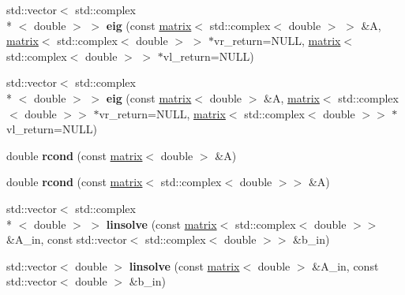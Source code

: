 \begin{DoxyCompactItemize}
\item 
\hypertarget{namespacekeycpp_a4262bb0ca13c9c1e11732b9b1dab65c6}{std\-::vector$<$ std\-::complex\\*
$<$ double $>$ $>$ {\bfseries eig} (const \hyperlink{classkeycpp_1_1matrix}{matrix}$<$ std\-::complex$<$ double $>$ $>$ \&A, \hyperlink{classkeycpp_1_1matrix}{matrix}$<$ std\-::complex$<$ double $>$ $>$ $\ast$vr\-\_\-return=N\-U\-L\-L, \hyperlink{classkeycpp_1_1matrix}{matrix}$<$ std\-::complex$<$ double $>$ $>$ $\ast$vl\-\_\-return=N\-U\-L\-L)}\label{namespacekeycpp_a4262bb0ca13c9c1e11732b9b1dab65c6}

\item 
\hypertarget{namespacekeycpp_a9e462b40dbbb92e5ebef12956d76e1f8}{std\-::vector$<$ std\-::complex\\*
$<$ double $>$ $>$ {\bfseries eig} (const \hyperlink{classkeycpp_1_1matrix}{matrix}$<$ double $>$ \&A, \hyperlink{classkeycpp_1_1matrix}{matrix}$<$ std\-::complex$<$ double $>$$>$ $\ast$vr\-\_\-return=N\-U\-L\-L, \hyperlink{classkeycpp_1_1matrix}{matrix}$<$ std\-::complex$<$ double $>$$>$ $\ast$vl\-\_\-return=N\-U\-L\-L)}\label{namespacekeycpp_a9e462b40dbbb92e5ebef12956d76e1f8}

\item 
\hypertarget{namespacekeycpp_a3905cfc35dbd146f5dbf7bcb5729c2c2}{double {\bfseries rcond} (const \hyperlink{classkeycpp_1_1matrix}{matrix}$<$ double $>$ \&A)}\label{namespacekeycpp_a3905cfc35dbd146f5dbf7bcb5729c2c2}

\item 
\hypertarget{namespacekeycpp_a4d9a9dd04453e5a417f7a9eb8ae4391b}{double {\bfseries rcond} (const \hyperlink{classkeycpp_1_1matrix}{matrix}$<$ std\-::complex$<$ double $>$$>$ \&A)}\label{namespacekeycpp_a4d9a9dd04453e5a417f7a9eb8ae4391b}

\item 
\hypertarget{namespacekeycpp_a9f68b3d9143ad3582e59dd0a4b1998b8}{std\-::vector$<$ std\-::complex\\*
$<$ double $>$ $>$ {\bfseries linsolve} (const \hyperlink{classkeycpp_1_1matrix}{matrix}$<$ std\-::complex$<$ double $>$$>$ \&A\-\_\-in, const std\-::vector$<$ std\-::complex$<$ double $>$$>$ \&b\-\_\-in)}\label{namespacekeycpp_a9f68b3d9143ad3582e59dd0a4b1998b8}

\item 
\hypertarget{namespacekeycpp_a46f4a25648e5bad1cf0bd0e7fca7fae0}{std\-::vector$<$ double $>$ {\bfseries linsolve} (const \hyperlink{classkeycpp_1_1matrix}{matrix}$<$ double $>$ \&A\-\_\-in, const std\-::vector$<$ double $>$ \&b\-\_\-in)}\label{namespacekeycpp_a46f4a25648e5bad1cf0bd0e7fca7fae0}


\end{DoxyCompactItemize}
